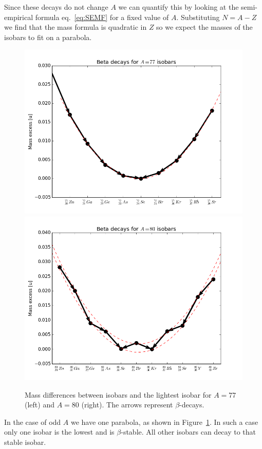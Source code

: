 \documentclass[12pt]{article}
\begin{document}
Since these decays do not change $A$ we can quantify this by looking at the semi-empirical formula eq.~\ref{eq:SEMF} for a fixed value of $A$. Substituting $N=A-Z$ we find that the mass formula is quadratic in $Z$ so we expect the masses of the isobars to fit on a parabola. 
\begin{figure}
\begin{center}
\includegraphics[scale=0.4]{images/isobar77.png}
\includegraphics[scale=0.4]{images/isobar80.png}
\end{center}
\caption{Mass differences between isobars and the lightest isobar for $A=77$ (left) and $A=80$ (right). The arrows represent $\beta$-decays.}\label{fig:isobars}
\end{figure}
In the case of odd $A$ we have one parabola, as shown in Figure~\ref{fig:isobars}. In such a case only one isobar is the lowest and is $\beta$-stable. All other isobars can decay to that stable isobar. 
\end{document}

